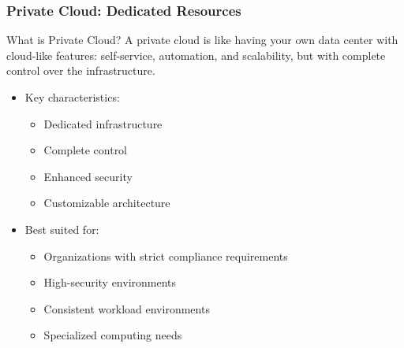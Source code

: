 \documentclass{beamer}
\begin{document}
\begin{frame}
    \frametitle{Private Cloud: Dedicated Resources}
    
    \begin{block}{What is Private Cloud?}
        A private cloud is like having your own data center with cloud-like features: self-service, automation, and scalability, but with complete control over the infrastructure.
    \end{block}
    
    \begin{itemize}
        \item Key characteristics:
        \begin{itemize}
            \item Dedicated infrastructure
            \item Complete control
            \item Enhanced security
            \item Customizable architecture
        \end{itemize}
        
        \item Best suited for:
        \begin{itemize}
            \item Organizations with strict compliance requirements
            \item High-security environments
            \item Consistent workload environments
            \item Specialized computing needs
        \end{itemize}
    \end{itemize}
\end{frame}
\end{document}
